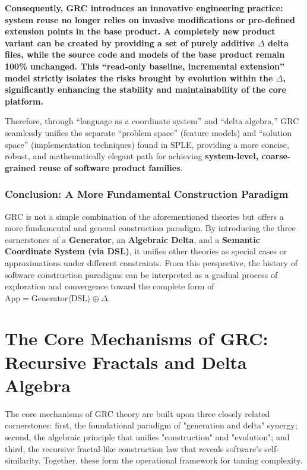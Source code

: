 \documentclass[11pt]{article}
\begin{document}
\textbf{Consequently, GRC introduces an innovative engineering practice: system reuse no longer relies on invasive modifications or pre-defined extension points in the base product. A completely new product variant can be created by providing a set of purely additive $\Delta$ delta files, while the source code and models of the base product remain 100\% unchanged. This ``read-only baseline, incremental extension'' model strictly isolates the risks brought by evolution within the $\Delta$, significantly enhancing the stability and maintainability of the core platform.}

Therefore, through ``language as a coordinate system'' and ``delta algebra,'' GRC seamlessly unifies the separate ``problem space'' (feature models) and ``solution space'' (implementation techniques) found in SPLE, providing a more concise, robust, and mathematically elegant path for achieving \textbf{system-level, coarse-grained reuse of software product families}.

\subsubsection{Conclusion: A More Fundamental Construction Paradigm}

GRC is not a simple combination of the aforementioned theories but offers a more fundamental and general construction paradigm. By introducing the three cornerstones of a \textbf{Generator}, an \textbf{Algebraic Delta}, and a \textbf{Semantic Coordinate System (via DSL)}, it unifies other theories as special cases or approximations under different constraints. From this perspective, the history of software construction paradigms can be interpreted as a gradual process of exploration and convergence toward the complete form of $\text{App} = \text{Generator}\langle\text{DSL}\rangle \oplus \Delta$.

\section{The Core Mechanisms of GRC: Recursive Fractals and Delta Algebra}

The core mechanisms of GRC theory are built upon three closely related cornerstones: first, the foundational paradigm of "generation and delta" synergy; second, the algebraic principle that unifies "construction" and "evolution"; and third, the recursive fractal-like construction law that reveals software's self-similarity. Together, these form the operational framework for taming complexity.
\end{document}
